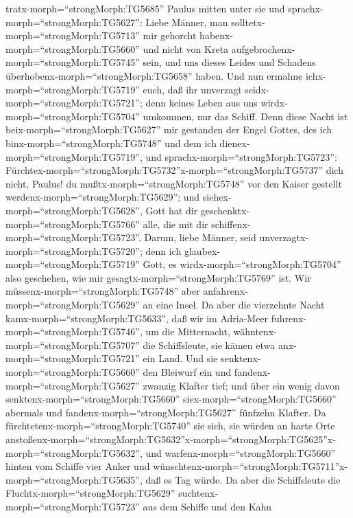 tratx-morph=``strongMorph:TG5685'' Paulus mitten unter sie und
sprachx-morph=``strongMorph:TG5627'': Liebe Männer, man
solltetx-morph=``strongMorph:TG5713'' mir gehorcht
habenx-morph=``strongMorph:TG5660'' und nicht von Kreta
aufgebrochenx-morph=``strongMorph:TG5745'' sein, und uns dieses Leides
und Schadens überhobenx-morph=``strongMorph:TG5658'' haben.
 Und nun ermahne ichx-morph=``strongMorph:TG5719'' euch,
daß ihr unverzagt seidx-morph=``strongMorph:TG5721''; denn keines Leben
aus uns wirdx-morph=``strongMorph:TG5704'' umkommen, nur das Schiff.
 Denn diese Nacht ist beix-morph=``strongMorph:TG5627'' mir
gestanden der Engel Gottes, des ich binx-morph=``strongMorph:TG5748''
und dem ich dienex-morph=``strongMorph:TG5719'',  und
sprachx-morph=``strongMorph:TG5723'':
Fürchtex-morph=``strongMorph:TG5732''\textbar x-morph=``strongMorph:TG5737''
dich nicht, Paulus! du mußtx-morph=``strongMorph:TG5748'' vor den Kaiser
gestellt werdenx-morph=``strongMorph:TG5629''; und
siehex-morph=``strongMorph:TG5628'', Gott hat dir
geschenktx-morph=``strongMorph:TG5766'' alle, die mit dir
schiffenx-morph=``strongMorph:TG5723''.  Darum, liebe
Männer, seid unverzagtx-morph=``strongMorph:TG5720''; denn ich
glaubex-morph=``strongMorph:TG5719'' Gott, es
wirdx-morph=``strongMorph:TG5704'' also geschehen, wie mir
gesagtx-morph=``strongMorph:TG5769'' ist.  Wir
müssenx-morph=``strongMorph:TG5748'' aber
anfahrenx-morph=``strongMorph:TG5629'' an eine Insel.  Da
aber die vierzehnte Nacht kamx-morph=``strongMorph:TG5633'', daß wir im
Adria-Meer fuhrenx-morph=``strongMorph:TG5746'', um die Mitternacht,
wähntenx-morph=``strongMorph:TG5707'' die Schiffsleute, sie kämen etwa
anx-morph=``strongMorph:TG5721'' ein Land.  Und sie
senktenx-morph=``strongMorph:TG5660'' den Bleiwurf ein und
fandenx-morph=``strongMorph:TG5627'' zwanzig Klafter tief; und über ein
wenig davon senktenx-morph=``strongMorph:TG5660''
siex-morph=``strongMorph:TG5660'' abermals und
fandenx-morph=``strongMorph:TG5627'' fünfzehn Klafter.  Da
fürchtetenx-morph=``strongMorph:TG5740'' sie sich, sie würden an harte
Orte
anstoßenx-morph=``strongMorph:TG5632''\textbar x-morph=``strongMorph:TG5625''x-morph=``strongMorph:TG5632'',
und warfenx-morph=``strongMorph:TG5660'' hinten vom Schiffe vier Anker
und
wünschtenx-morph=``strongMorph:TG5711''x-morph=``strongMorph:TG5635'',
daß es Tag würde.  Da aber die Schiffsleute die
Fluchtx-morph=``strongMorph:TG5629''
suchtenx-morph=``strongMorph:TG5723'' aus dem Schiffe und den Kahn
